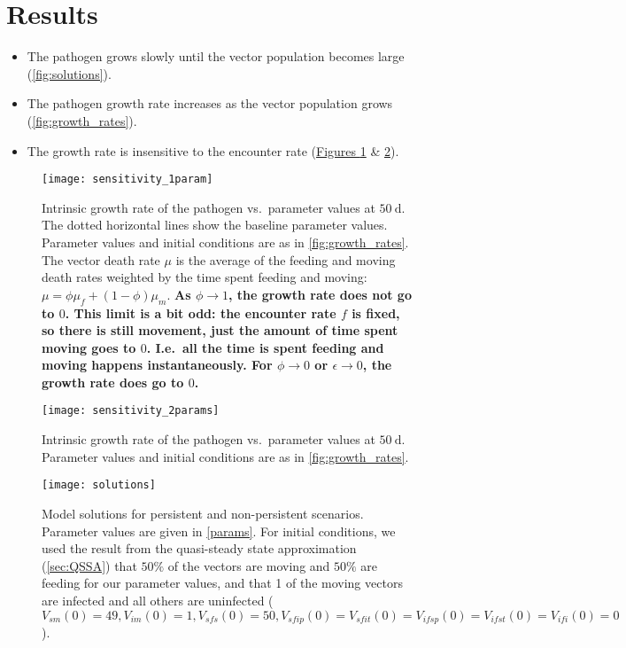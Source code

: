 \documentclass{article}
\newcommand{\comment}[1]{\textbf{#1}}
\begin{document}
\section{Results}

\begin{itemize}
\item The pathogen grows slowly until the vector population becomes
  large (\autoref{fig:solutions}).

\item The pathogen growth rate increases as the vector population
  grows (\autoref{fig:growth_rates}).

\item The growth rate is insensitive to the encounter rate
  (\hyperref[fig:sensitivity_1param]{Figures
    \ref*{fig:sensitivity_1param}} \& \ref{fig:sensitivity_2params}).
\end{itemize}


\begin{figure}
  \centering
  \texttt{[image: sensitivity\_1param]}
  \caption{Intrinsic growth rate of the pathogen vs.~parameter values
    at $50~\text{d}$.  The dotted horizontal lines show the baseline
    parameter values.  Parameter values and initial conditions are as
    in \autoref{fig:growth_rates}.  The vector death rate $\mu$ is the
    average of the feeding and moving death rates weighted by the time
    spent feeding and moving: $\mu = \phi \mu_f + (1 - \phi) \mu_m$.
    \comment{As $\phi \to 1$, the
      growth rate does not go to $0$.  This limit is a bit odd: the
      encounter rate $f$ is fixed, so there is still movement, just
      the amount of time spent moving goes to $0$.  I.e.~all the time
      is spent feeding and moving happens instantaneously.  For
      $\phi \to 0$ or $\epsilon \to 0$, the growth rate does go to
      $0$.}}
  \label{fig:sensitivity_1param}
\end{figure}

\begin{figure}
  \centering
  \texttt{[image: sensitivity\_2params]}
  \caption{Intrinsic growth rate of the pathogen vs.~parameter values
    at $50~\text{d}$.  Parameter values and initial conditions are as
    in \autoref{fig:growth_rates}.}
  \label{fig:sensitivity_2params}
\end{figure}


\clearpage
\appendix
\renewcommand{\thefigure}{A\arabic{figure}}
\setcounter{figure}{0}


\begin{figure}
  \centering
  \texttt{[image: solutions]}
  \caption{Model solutions for persistent and non-persistent
    scenarios.  Parameter values are given in \autoref{params}.
    For initial conditions, we used the result from the quasi-steady
    state approximation (\autoref{sec:QSSA}) that $50\%$ of the
    vectors are moving and $50\%$ are feeding for our parameter
    values, and that 1 of the moving vectors are infected and all
    others are uninfected ($V_{sm}(0) = 49, V_{im}(0) = 1, V_{sfs}(0) =
    50, V_{sfip}(0) = V_{sfit}(0) = V_{ifsp}(0) = V_{ifst}(0) =
    V_{ifi}(0) = 0$).}
  \label{fig:solutions}
\end{figure}
\end{document}
